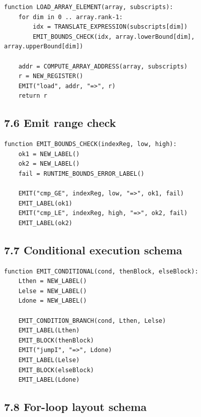 \documentclass[10pt,letterpaper]{article}
\begin{document}
\begin{verbatim}
function LOAD_ARRAY_ELEMENT(array, subscripts):
    for dim in 0 .. array.rank-1:
        idx = TRANSLATE_EXPRESSION(subscripts[dim])
        EMIT_BOUNDS_CHECK(idx, array.lowerBound[dim], array.upperBound[dim])

    addr = COMPUTE_ARRAY_ADDRESS(array, subscripts)
    r = NEW_REGISTER()
    EMIT("load", addr, "=>", r)
    return r
\end{verbatim}

\subsection*{7.6 Emit range check}
{}

\begin{verbatim}
function EMIT_BOUNDS_CHECK(indexReg, low, high):
    ok1 = NEW_LABEL()
    ok2 = NEW_LABEL()
    fail = RUNTIME_BOUNDS_ERROR_LABEL()

    EMIT("cmp_GE", indexReg, low, "=>", ok1, fail)
    EMIT_LABEL(ok1)
    EMIT("cmp_LE", indexReg, high, "=>", ok2, fail)
    EMIT_LABEL(ok2)
\end{verbatim}

\subsection*{7.7 Conditional execution schema}
{}

\begin{verbatim}
function EMIT_CONDITIONAL(cond, thenBlock, elseBlock):
    Lthen = NEW_LABEL()
    Lelse = NEW_LABEL()
    Ldone = NEW_LABEL()

    EMIT_CONDITION_BRANCH(cond, Lthen, Lelse)
    EMIT_LABEL(Lthen)
    EMIT_BLOCK(thenBlock)
    EMIT("jumpI", "=>", Ldone)
    EMIT_LABEL(Lelse)
    EMIT_BLOCK(elseBlock)
    EMIT_LABEL(Ldone)
\end{verbatim}

\subsection*{7.8 For-loop layout schema}
{}
\end{document}
